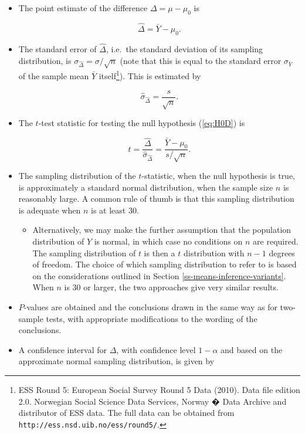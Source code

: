 \documentclass[11pt,a4paper,openany]{book}
\providecommand{\tightlist}{%
  \setlength{\itemsep}{0pt}\setlength{\parskip}{0pt}}
\let\rmarkdownfootnote\footnote%
\def\footnote{\protect\rmarkdownfootnote}
\begin{document}
\begin{itemize}
\item
  The point estimate of the difference \(\Delta=\mu-\mu_{0}\) is

  \begin{equation}\hat{\Delta}=\bar{Y}-\mu_{0}.
  \label{eq:Dhat1}\end{equation}
\item
  The standard error of \(\hat{\Delta}\), i.e.~the standard deviation of
  its sampling distribution, is
  \(\sigma_{\hat{\Delta}}=\sigma/\sqrt{n}\) (note that this is equal to
  the standard error \(\sigma_{\bar{Y}}\) of the sample mean \(\bar{Y}\)
  itself\footnote{ESS Round 5: European Social Survey Round 5 Data
    (2010). Data file edition 2.0. Norwegian Social Science Data
    Services, Norway � Data Archive and distributor of ESS data. The
    full data can be obtained from
    \texttt{http://ess.nsd.uib.no/ess/round5/}.}). This is estimated by

  \begin{equation}\hat{\sigma}_{\hat{\Delta}} = \frac{s}{\sqrt{n}}.
  \label{eq:seDhat1}\end{equation}
\item
  The \(t\)-test statistic for testing the null hypothesis
  (\ref{eq:H0D}) is

  \begin{equation}t=\frac{\hat{\Delta}}{\hat{\sigma}_{\hat{\Delta}}} =
  \frac{\bar{Y}-\mu_{0}}{s/\sqrt{n}}.
  \label{eq:tD1}\end{equation}
\item
  The sampling distribution of the \(t\)-statistic, when the null
  hypothesis is true, is approximately a standard normal distribution,
  when the sample size \(n\) is reasonably large. A common rule of thumb
  is that this sampling distribution is adequate when \(n\) is at least
  30.

  \begin{itemize}
  \tightlist
  \item
    Alternatively, we may make the further assumption that the
    population distribution of \(Y\) is normal, in which case no
    conditions on \(n\) are required. The sampling distribution of \(t\)
    is then a \(t\) distribution with \(n-1\) degrees of freedom. The
    choice of which sampling distribution to refer to is based on the
    considerations outlined in Section
    \ref{ss-means-inference-variants}. When \(n\) is 30 or larger, the
    two approaches give very similar results.
  \end{itemize}
\item
  \(P\)-values are obtained and the conclusions drawn in the same way as
  for two-sample tests, with appropriate modifications to the wording of
  the conclusions.
\item
  A confidence interval for \(\Delta\), with confidence level
  \(1-\alpha\) and based on the approximate normal sampling
  distribution, is given by


\end{itemize}
\end{document}
